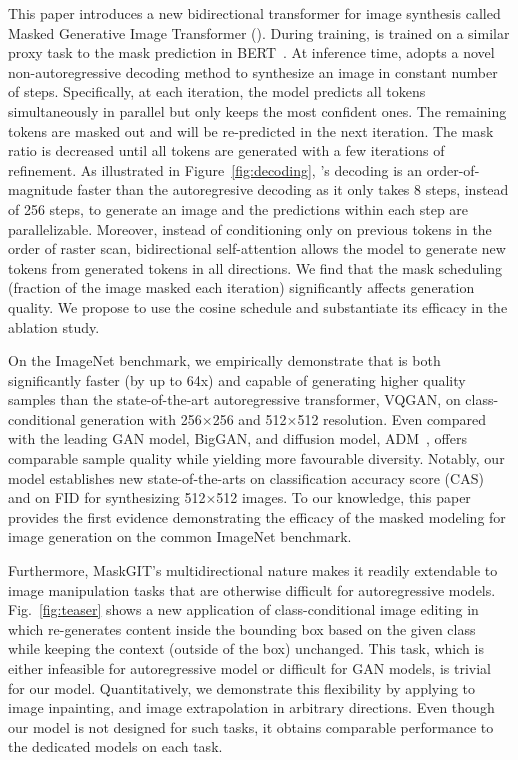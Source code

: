 This paper introduces a new bidirectional transformer for image synthesis called Masked Generative Image Transformer (\model). During training, \model is trained on a similar proxy task to the mask prediction in BERT~\cite{Devlin19bert}. At inference time, \model adopts a novel non-autoregressive decoding method to synthesize an image in constant number of steps. Specifically, at each iteration, the model predicts all tokens simultaneously in parallel but only keeps the most confident ones. The remaining tokens are masked out and will be re-predicted in the next iteration. The mask ratio is decreased until all tokens are generated with a few iterations of refinement. As illustrated in Figure~\ref{fig:decoding}, \model's decoding is an order-of-magnitude faster than the autoregresive decoding as it only takes 8 steps, instead of 256 steps, to generate an image and the predictions within each step are parallelizable. Moreover, instead of conditioning only on previous tokens in the order of raster scan, bidirectional self-attention allows the model to generate new tokens from generated tokens in all directions. We find that the mask scheduling (\ie fraction of the image masked each iteration) significantly affects generation quality. We propose to use the cosine schedule and substantiate its efficacy in the ablation study.

On the ImageNet benchmark, we empirically demonstrate that \model is both significantly faster (by up to 64x) and capable of generating higher quality samples than the state-of-the-art autoregressive transformer, \ie VQGAN, on class-conditional generation with 256$\times$256 and 512$\times$512 resolution. Even compared with the leading GAN model, \ie BigGAN, and diffusion model, \ie ADM~\cite{dhariwal2021diffusion}, \model offers comparable sample quality while yielding more favourable diversity. Notably, our model establishes new state-of-the-arts on classification accuracy score (CAS)~\cite{Ravuri19CAS} and on FID\cite{FID} for synthesizing 512$\times$512 images. To our knowledge, this paper provides the first evidence demonstrating the efficacy of the masked modeling for image generation on the common ImageNet benchmark.  

Furthermore, MaskGIT's multidirectional nature makes it readily extendable to image manipulation tasks that are otherwise difficult for autoregressive models. Fig.~\ref{fig:teaser} shows a new application of class-conditional image editing in which \model re-generates content inside the bounding box based on the given class while keeping the context (outside of the box) unchanged. This task, which is either infeasible for autoregressive model or difficult for GAN models, is trivial for our model.
Quantitatively, we demonstrate this flexibility by applying \model to image inpainting, and image extrapolation in arbitrary directions.
Even though our model is not designed for such tasks, it obtains comparable performance to the dedicated models on each task.

